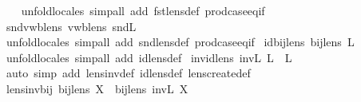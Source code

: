 \begin{isabellebody}
%
\isadelimproof
\ \ %
\endisadelimproof
%
\isatagproof
{}\isamarkupfalse%
\ {\isacharparenleft}unfold{\isacharunderscore}locales{\isacharcomma}\ simp{\isacharunderscore}all\ add{\isacharcolon}\ fst{\isacharunderscore}lens{\isacharunderscore}def\ prod{\isachardot}case{\isacharunderscore}eq{\isacharunderscore}if{\isacharparenright}%
\endisatagproof
{\isafoldproof}%
%
\isadelimproof
\isanewline
%
\endisadelimproof
\isanewline
{}\isamarkupfalse%
\ snd{\isacharunderscore}vwb{\isacharunderscore}lens{\isacharcolon}\ {\isachardoublequoteopen}vwb{\isacharunderscore}lens\ snd\isactrlsub L{\isachardoublequoteclose}\isanewline
%
\isadelimproof
\ \ %
\endisadelimproof
%
\isatagproof
{}\isamarkupfalse%
\ {\isacharparenleft}unfold{\isacharunderscore}locales{\isacharcomma}\ simp{\isacharunderscore}all\ add{\isacharcolon}\ snd{\isacharunderscore}lens{\isacharunderscore}def\ prod{\isachardot}case{\isacharunderscore}eq{\isacharunderscore}if{\isacharparenright}%
\endisatagproof
{\isafoldproof}%
%
\isadelimproof
\isanewline
%
\endisadelimproof
\isanewline
{}\isamarkupfalse%
\ id{\isacharunderscore}bij{\isacharunderscore}lens{\isacharcolon}\ {\isachardoublequoteopen}bij{\isacharunderscore}lens\ {}\isactrlsub L{\isachardoublequoteclose}\isanewline
%
\isadelimproof
\ \ %
\endisadelimproof
%
\isatagproof
{}\isamarkupfalse%
\ {\isacharparenleft}unfold{\isacharunderscore}locales{\isacharcomma}\ simp{\isacharunderscore}all\ add{\isacharcolon}\ id{\isacharunderscore}lens{\isacharunderscore}def{\isacharparenright}%
\endisatagproof
{\isafoldproof}%
%
\isadelimproof
\isanewline
%
\endisadelimproof
\isanewline
{}\isamarkupfalse%
\ inv{\isacharunderscore}id{\isacharunderscore}lens{\isacharcolon}\ {\isachardoublequoteopen}inv\isactrlsub L\ {}\isactrlsub L\ {\isacharequal}\ {}\isactrlsub L{\isachardoublequoteclose}\isanewline
%
\isadelimproof
\ \ %
\endisadelimproof
%
\isatagproof
{}\isamarkupfalse%
\ {\isacharparenleft}auto\ simp\ add{\isacharcolon}\ lens{\isacharunderscore}inv{\isacharunderscore}def\ id{\isacharunderscore}lens{\isacharunderscore}def\ lens{\isacharunderscore}create{\isacharunderscore}def{\isacharparenright}%
\endisatagproof
{\isafoldproof}%
%
\isadelimproof
\isanewline
%
\endisadelimproof
\isanewline
{}\isamarkupfalse%
\ lens{\isacharunderscore}inv{\isacharunderscore}bij{\isacharcolon}\ {\isachardoublequoteopen}bij{\isacharunderscore}lens\ X\ {\isasymLongrightarrow}\ bij{\isacharunderscore}lens\ {\isacharparenleft}inv\isactrlsub L\ X{\isacharparenright}{\isachardoublequoteclose}\isanewline

\end{isabellebody}
